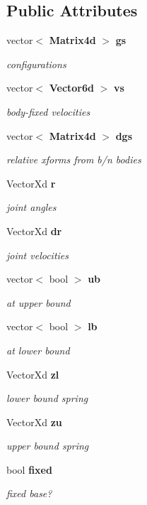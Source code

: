 \subsection*{\-Public \-Attributes}
\begin{DoxyCompactItemize}
\item 
vector$<$ {\bf \-Matrix4d} $>$ {\bf gs}
\begin{DoxyCompactList}\small\item\em configurations \end{DoxyCompactList}\item 
vector$<$ {\bf \-Vector6d} $>$ {\bf vs}
\begin{DoxyCompactList}\small\item\em body-\/fixed velocities \end{DoxyCompactList}\item 
vector$<$ {\bf \-Matrix4d} $>$ {\bf dgs}
\begin{DoxyCompactList}\small\item\em relative xforms from b/n bodies \end{DoxyCompactList}\item 
\-Vector\-Xd {\bf r}
\begin{DoxyCompactList}\small\item\em joint angles \end{DoxyCompactList}\item 
\-Vector\-Xd {\bf dr}
\begin{DoxyCompactList}\small\item\em joint velocities \end{DoxyCompactList}\item 
vector$<$ bool $>$ {\bf ub}
\begin{DoxyCompactList}\small\item\em at upper bound \end{DoxyCompactList}\item 
vector$<$ bool $>$ {\bf lb}
\begin{DoxyCompactList}\small\item\em at lower bound \end{DoxyCompactList}\item 
\-Vector\-Xd {\bf zl}
\begin{DoxyCompactList}\small\item\em lower bound spring \end{DoxyCompactList}\item 
\-Vector\-Xd {\bf zu}
\begin{DoxyCompactList}\small\item\em upper bound spring \end{DoxyCompactList}\item 
bool {\bf fixed}
\begin{DoxyCompactList}\small\item\em fixed base? \end{DoxyCompactList}\end{DoxyCompactItemize}


